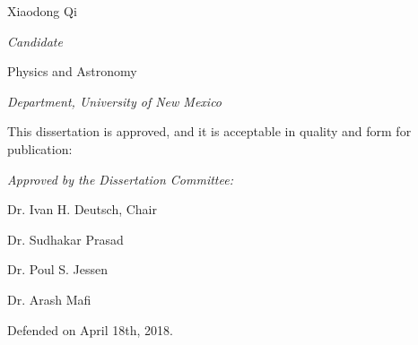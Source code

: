 \documentclass[letterpaper,10pt]{article}
\begin{document}
\vspace{0.5in}
\begin{Large}
 \noindent Xiaodong Qi 
 \vspace{-0.2in}
 \end{Large}

 \noindent\makebox[\linewidth][l]{\rule{2.8in}{1pt}}
  \textit{Candidate} \vspace{0.4in}
 
 \begin{Large}
 \noindent Physics and Astronomy
 \vspace{-0.2in}
 \end{Large}
 
  \noindent\makebox[\linewidth][l]{\rule{2.8in}{1pt}} 
    \textit{Department, University of New Mexico} \vspace{0.2in}


 
 
   \noindent This dissertation is approved, and it is acceptable in quality and form for publication: \vspace{0.2in}
\begin{large}
 \noindent \textit{Approved by the Dissertation Committee:} \vspace{0.45in}
 \end{large}
 
%  
%  
%  

 

 \noindent\makebox[\linewidth]{\rule{5.5in}{1pt}}
 
  \hfill Dr. Ivan H. Deutsch, Chair \vspace{0.35in}
  
  

  \noindent\makebox[\linewidth]{\rule{5.5in}{1pt}}
   
   \hfill Dr. Sudhakar Prasad  \vspace{0.35in}
 
 
  \noindent\makebox[\linewidth]{\rule{5.5in}{1pt}}
  
    \hfill Dr. Poul S. Jessen  \vspace{0.35in}
 
 

  \noindent\makebox[\linewidth]{\rule{5.5in}{1pt}}
    
    \hfill Dr. Arash Mafi  \vspace{0.05in}
    
      
Defended on April 18th, 2018.
 
\end{document}
